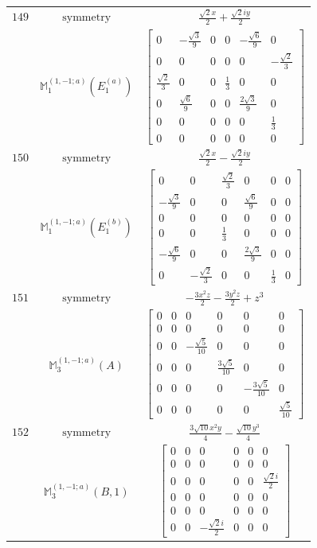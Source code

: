 \documentclass[fleqn,8pt,landscape]{jsarticle}
\begin{document}
\begin{longtable}{ccc}
$ 149 $ & $ \text{symmetry} $ & $ \frac{\sqrt{2} x}{2} + \frac{\sqrt{2} i y}{2} $ \\
$  $ & $ \mathbb{M}_{1}^{(1,-1;a)}(E_{1}^{(a)}) $ & $ \begin{bmatrix} 0 & - \frac{\sqrt{3}}{9} & 0 & 0 & - \frac{\sqrt{6}}{9} & 0 \\ 0 & 0 & 0 & 0 & 0 & - \frac{\sqrt{2}}{3} \\ \frac{\sqrt{2}}{3} & 0 & 0 & \frac{1}{3} & 0 & 0 \\ 0 & \frac{\sqrt{6}}{9} & 0 & 0 & \frac{2 \sqrt{3}}{9} & 0 \\ 0 & 0 & 0 & 0 & 0 & \frac{1}{3} \\ 0 & 0 & 0 & 0 & 0 & 0 \end{bmatrix} $ \\ \hline
$ 150 $ & $ \text{symmetry} $ & $ \frac{\sqrt{2} x}{2} - \frac{\sqrt{2} i y}{2} $ \\
$  $ & $ \mathbb{M}_{1}^{(1,-1;a)}(E_{1}^{(b)}) $ & $ \begin{bmatrix} 0 & 0 & \frac{\sqrt{2}}{3} & 0 & 0 & 0 \\ - \frac{\sqrt{3}}{9} & 0 & 0 & \frac{\sqrt{6}}{9} & 0 & 0 \\ 0 & 0 & 0 & 0 & 0 & 0 \\ 0 & 0 & \frac{1}{3} & 0 & 0 & 0 \\ - \frac{\sqrt{6}}{9} & 0 & 0 & \frac{2 \sqrt{3}}{9} & 0 & 0 \\ 0 & - \frac{\sqrt{2}}{3} & 0 & 0 & \frac{1}{3} & 0 \end{bmatrix} $ \\ \hline
$ 151 $ & $ \text{symmetry} $ & $ - \frac{3 x^{2} z}{2} - \frac{3 y^{2} z}{2} + z^{3} $ \\
$  $ & $ \mathbb{M}_{3}^{(1,-1;a)}(A) $ & $ \begin{bmatrix} 0 & 0 & 0 & 0 & 0 & 0 \\ 0 & 0 & 0 & 0 & 0 & 0 \\ 0 & 0 & - \frac{\sqrt{5}}{10} & 0 & 0 & 0 \\ 0 & 0 & 0 & \frac{3 \sqrt{5}}{10} & 0 & 0 \\ 0 & 0 & 0 & 0 & - \frac{3 \sqrt{5}}{10} & 0 \\ 0 & 0 & 0 & 0 & 0 & \frac{\sqrt{5}}{10} \end{bmatrix} $ \\ \hline
$ 152 $ & $ \text{symmetry} $ & $ \frac{3 \sqrt{10} x^{2} y}{4} - \frac{\sqrt{10} y^{3}}{4} $ \\
$  $ & $ \mathbb{M}_{3}^{(1,-1;a)}(B,1) $ & $ \begin{bmatrix} 0 & 0 & 0 & 0 & 0 & 0 \\ 0 & 0 & 0 & 0 & 0 & 0 \\ 0 & 0 & 0 & 0 & 0 & \frac{\sqrt{2} i}{2} \\ 0 & 0 & 0 & 0 & 0 & 0 \\ 0 & 0 & 0 & 0 & 0 & 0 \\ 0 & 0 & - \frac{\sqrt{2} i}{2} & 0 & 0 & 0 \end{bmatrix} $ \\ \hline

\end{longtable}
\end{document}
